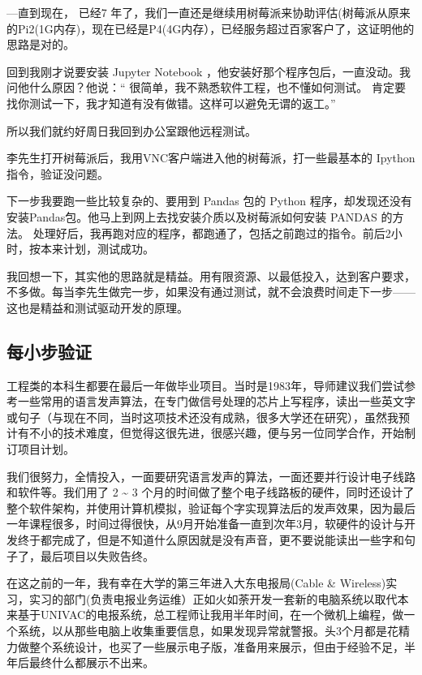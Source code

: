 ---直到现在， 已经7
年了，我们一直还是继续用树莓派来协助评估(树莓派从原来的Pi2(1G内存)，现在已经是P4(4G内存），已经服务超过百家客户了，这证明他的思路是对的。

回到我刚才说要安装 Jupyter Notebook
，他安装好那个程序包后，一直没动。我问他什么原因？他说：``
很简单，我不熟悉软件工程，也不懂如何测试。
肯定要找你测试一下，我才知道有没有做错。这样可以避免无谓的返工。''

所以我们就约好周日我回到办公室跟他远程测试。

李先生打开树莓派后，我用VNC客户端进入他的树莓派，打一些最基本的 Ipython
指令，验证没问题。

下一步我要跑一些比较复杂的、要用到 Pandas 包的 Python
程序，却发现还没有安装Pandas包。他马上到网上去找安装介质以及树莓派如何安装
PANDAS 的方法。
处理好后，我再跑对应的程序，都跑通了，包括之前跑过的指令。前后2小时，按本来计划，测试成功。

我回想一下，其实他的思路就是精益。用有限资源、以最低投入，达到客户要求，不多做。每当李先生做完一步，如果没有通过测试，就不会浪费时间走下一步------这也是精益和测试驱动开发的原理。

\hypertarget{ux6bcfux5c0fux6b65ux9a8cux8bc1}{%
\subsection{每小步验证}\label{ux6bcfux5c0fux6b65ux9a8cux8bc1}}

工程类的本科生都要在最后一年做毕业项目。当时是1983年，导师建议我们尝试参考一些常用的语言发声算法，在专门做信号处理的芯片上写程序，读出一些英文字或句子（与现在不同，当时这项技术还没有成熟，很多大学还在研究），虽然我预计有不小的技术难度，但觉得这很先进，很感兴趣，便与另一位同学合作，开始制订项目计划。

我们很努力，全情投入，一面要研究语言发声的算法，一面还要并行设计电子线路和软件等。我们用了
2 \textasciitilde{} 3
个月的时间做了整个电子线路板的硬件，同时还设计了整个软件架构，并使用计算机模拟，验证每个字实现算法后的发声效果，因为最后一年课程很多，时间过得很快，从9月开始准备一直到次年3月，软硬件的设计与开发终于都完成了，但是不知道什么原因就是没有声音，更不要说能读出一些字和句子了，最后项目以失败告终。

在这之前的一年，我有幸在大学的第三年进入大东电报局(Cable \&
Wireless)实习，实习的部门(负责电报业务运维）正如火如荼开发一套新的电脑系统以取代本来基于UNIVAC的电报系统，总工程师让我用半年时间，在一个微机上编程，做一个系统，以从那些电脑上收集重要信息，如果发现异常就警报。头3个月都是花精力做整个系统设计，也买了一些展示电子版，准备用来展示，但由于经验不足，半年后最终什么都展示不出来。

